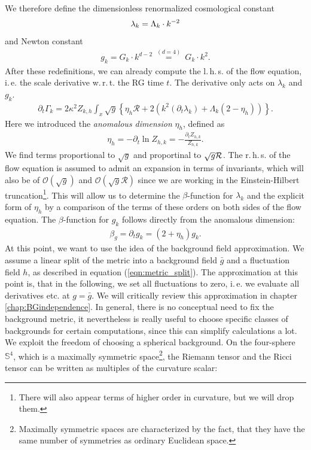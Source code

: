 We therefore define the dimensionless renormalized cosmological constant 
\begin{align}
	\lambda_k = \Lambda_k\cdot k^{-2}
\end{align}
and Newton constant
\begin{align}
	g_k = G_k\cdot k^{d-2} \ \overset{(d=4)}{=} \ G_k\cdot k^{2}.
\end{align}
After these redefinitions, we can already compute the l.\,h.\,s. of the flow equation, i.\,e. the scale derivative w.\,r.\,t. the RG time $t$. The derivative only acts on $\lambda_k$ and $g_k$.
\begin{align}
	\partial_{t}\Gamma_{k} = 2\kappa^2 Z_{k,h}\int_x \sqrt{g} \left\{\eta_h\mathcal{R}+2\left(k^2(\partial_t\lambda_k) + \Lambda_k(2 - \eta_h)\right)\right\}.
	\label{eqn:LHS}
\end{align}
Here we introduced the \textit{anomalous dimension} $\eta_h$, defined as
\begin{align}
	\eta_h=-\partial_t \ln Z_{h,k} = -\frac{\partial_tZ_{h,k}}{Z_{h,k}}.
\end{align} 
We find terms proportional to $\sqrt{g}$ and proportinal to $\sqrt{g}\mathcal{R}$. The r.\,h.\,s. of the flow equation is assumed to admit an expansion in terms of invariants, which will also be of $\mathcal{O}\left(\sqrt{g}\right)$ and  $\mathcal{O}\left(\sqrt{g}\mathcal{R}\right)$ since we are working in the Einstein-Hilbert truncation\footnote{There will also appear terms of higher order in curvature, but we will drop them.}. This will allow us to determine the $\beta$-function for $\lambda_k$ and the explicit form of $\eta_h$ by a comparison of the terms of these orders on both sides of the flow equation.
The $\beta$-function for $g_k$ follows directly from the anomalous dimension:
\begin{align}
	\beta_g = \partial_t g_k = \left(2 + \eta_h\right)g_k.
\end{align}
At this point, we want to use the idea of the background field approximation. We assume a linear split of the metric into a background field $\bar{g}$ and a fluctuation field $h$, as described in  equation (\ref{eqn:metric_split}). The approximation at this point is, that in the following, we set all fluctuations to zero, i.\,e. we evaluate all derivatives etc. at $g=\bar{g}$. We will critically review this approximation in chapter \ref{chap:BGindependence}. In general, there is no conceptual need to fix the background metric, it nevertheless is really useful to choose specific classes of backgrounds for certain computations, since this can simplify calculations a lot. We exploit the freedom of choosing a spherical background. On the four-sphere $\mathbb{S}^4$, which is a maximally symmetric space\footnote{Maximally symmetric spaces are characterized by the fact, that they have the same number of symmetries as ordinary Euclidean space.}, the Riemann tensor and the Ricci tensor can be written as multiples of the curvature scalar:
